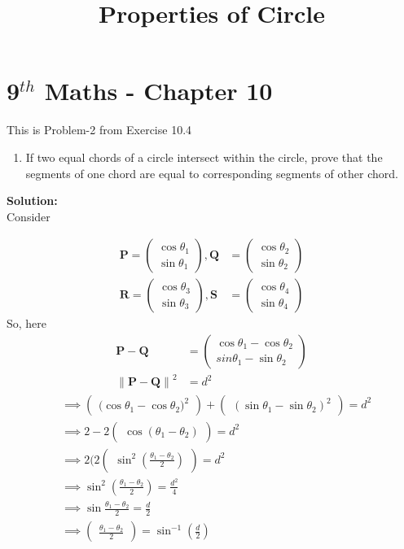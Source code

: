 \documentclass[12pt]{article}
\providecommand{\norm}[1]{\left\lVert#1\right\rVert}
\newcommand{\solution}{\noindent \textbf{Solution: }}
\newcommand{\myvec}[1]{\ensuremath{\begin{pmatrix}#1\end{pmatrix}}}
\let\vec\mathbf
\begin{document}
\begin{center}
\title{\textbf{Properties of Circle}}
\date{\vspace{-5ex}} %
\maketitle
\end{center}

\setcounter{page}{1}

\section{9$^{th}$ Maths - Chapter 10}

This is Problem-2 from Exercise 10.4

\begin{enumerate}
\item If two equal chords of a circle intersect within the circle, prove that the segments of one chord are equal to corresponding segments of other chord.
\end{enumerate}
\solution
\\
Consider 
\begin{center}
\begin{table}[ht!]
	
\caption{}
\label{table}
\end{table}
\end{center}
\begin{align}
\vec{P}=\myvec{\cos \theta_1\\\sin \theta_1},
\vec{Q}&=\myvec{\cos \theta_2\\\sin \theta_2}\\
\vec{R}=\myvec{\cos \theta_3\\\sin \theta_3},
\vec{S}&=\myvec{\cos \theta_4\\\sin \theta_4}
\end{align}
So, here
\begin{align}
	\vec{P}-\vec{Q}&=\myvec{\cos\theta_1-\cos\theta_2\\{sin \theta_1}-{\sin \theta_2}}\\
	\norm{\vec{P}-\vec{Q}}^2&=d^2
		\end{align}
		\begin{align}
	&\implies\myvec{({\cos \theta_1}-{\cos \theta_2)}^2}+\myvec{({\sin \theta_1}-{\sin \theta_2})^2}=d^2\\
	&\implies2-2\myvec{\cos(\theta_1-\theta_2)}=d^2\\
	&\implies2(2\myvec{{\sin^2}(\frac{\theta_1-\theta_2}{2})}=d^2\\
	&\implies\sin^2(\frac{\theta_1-\theta_2}{2})=\frac{d^2}{4}\\
	&\implies\sin\frac{\theta_1-\theta_2}{2}=\frac{d}{2}\\
&\implies\myvec{\frac{\theta_1-\theta_2}{2}}=\sin^{-1}(\frac{d}{2})
	\end{align}
\end{document}
